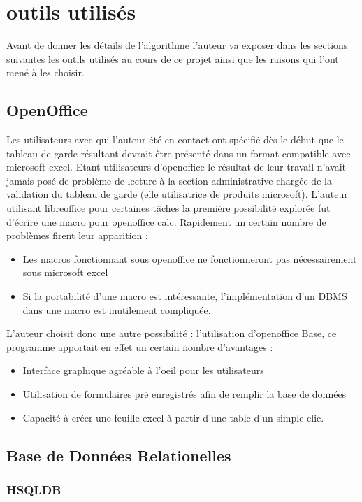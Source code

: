 \documentclass[11pt]{report}
\begin{document}
\section{outils utilisés}
Avant de donner les détails de l'algorithme l'auteur va exposer dans les sections suivantes les outils utilisés au cours de ce projet ainsi que les raisons qui l'ont mené à les choisir.
\subsection{OpenOffice}
	Les utilisateurs avec qui l'auteur été en contact ont spécifié dès le début que le tableau de garde résultant devrait être présenté dans un format compatible avec microsoft excel. 
Etant utilisateurs d'openoffice\cite{openoffice} le résultat de leur travail n'avait jamais posé de problème de lecture à la section administrative chargée de la validation du tableau de garde (elle utilisatrice de produits microsoft).
L'auteur utilisant libreoffice\cite{libreoffice} pour certaines tâches la première possibilité explorée fut d'écrire une macro pour openoffice calc.
Rapidement un certain nombre de problèmes firent leur apparition : 
\begin{itemize}
\item Les macros fonctionnant sous openoffice ne fonctionneront pas nécessairement sous microsoft excel
\item Si la portabilité d'une macro est intéressante, l'implémentation d'un DBMS\cite{DBMS} dans une macro est inutilement compliquée\cite{wheel}.
\end{itemize}

L'auteur choisit donc une autre possibilité : l'utilisation d'openoffice Base, ce programme apportait en effet un certain nombre d'avantages : 
\begin{itemize}
\item Interface graphique agréable à l'oeil pour les utilisateurs
\item Utilisation de formulaires pré enregistrés afin de remplir la base de données
\item Capacité à créer une feuille excel à partir d'une table d'un simple clic.
\end{itemize}
\subsection{Base de Données Relationelles}
\subsubsection{HSQLDB}
\end{document}
